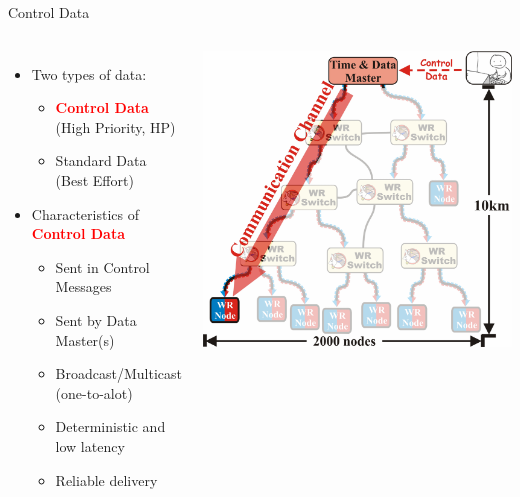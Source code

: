 \documentclass[compress,red]{beamer}
\begin{document}
\begin{frame}{Control Data}

\begin{columns}[c]
    \begin{itemize}
      \item Two types of data:
	  \begin{itemize}
	    \item \textcolor{red}{\bf Control Data} (High Priority, HP)
	    \item Standard Data (Best Effort)
	  \end{itemize}
	  \item Characteristics of \textcolor{red}{\bf Control Data}
	  \begin{itemize}
	    \item Sent in Control Messages
	    \item Sent by Data Master(s)
	    \item Broadcast/Multicast (one-to-alot)
	    \item Deterministic and low latency
	    \item Reliable delivery
	  \end{itemize}
    \end{itemize}
    \begin{center}
    \includegraphics[height=0.6\textheight]{robustness/CommunicationChannel.pdf}
    \end{center}

\end{columns}

\end{frame}
\end{document}
